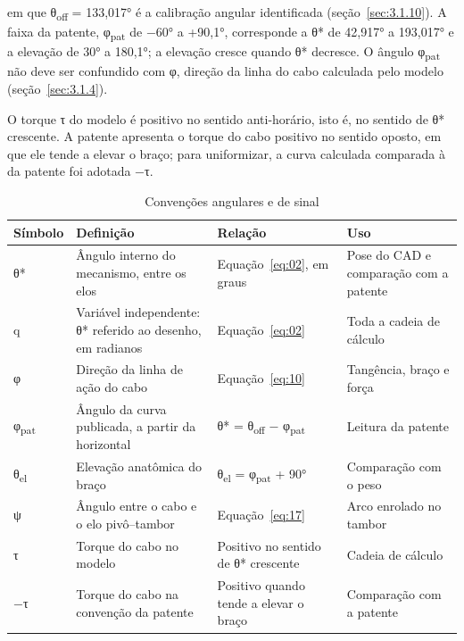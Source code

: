 em que θ\textsubscript{off} = 133,017° é a calibração angular identificada (seção~\ref{sec:3.1.10}). A faixa da patente, φ\textsubscript{pat} de −60° a +90,1°, corresponde a θ* de 42,917° a 193,017° e a elevação de 30° a 180,1°; a elevação cresce quando θ* decresce. O ângulo φ\textsubscript{pat} não deve ser confundido com φ, direção da linha do cabo calculada pelo modelo (seção~\ref{sec:3.1.4}).

O torque τ do modelo é positivo no sentido anti-horário, isto é, no sentido de θ* crescente. A patente apresenta o torque do cabo positivo no sentido oposto, em que ele tende a elevar o braço; para uniformizar, a curva calculada comparada à da patente foi adotada −τ.

\begin{table}[!htbp]
\estilotabela{\small}
\caption{Convenções angulares e de sinal}\label{tab:convencoes-angulares-sinal}
\begin{tabularx}{\textwidth}{@{}>{\hsize=0.556\hsize\centering\arraybackslash}X>{\hsize=1.368\hsize\raggedright\arraybackslash}X>{\hsize=1.179\hsize\raggedright\arraybackslash}X>{\hsize=0.897\hsize\raggedright\arraybackslash}X@{}}
\toprule
\centering\textbf{Símbolo} & \centering\textbf{Definição} & \centering\textbf{Relação} & \centering\textbf{Uso} \tabularnewline
\midrule
θ* & Ângulo interno do mecanismo, entre os elos & Equação~\eqref{eq:02}, em graus & Pose do CAD e comparação com a patente \\
q & Variável independente: θ* referido ao desenho, em radianos & Equação~\eqref{eq:02} & Toda a cadeia de cálculo \\
φ & Direção da linha de ação do cabo & Equação~\eqref{eq:10} & Tangência, braço e força \\
φ\textsubscript{pat} & Ângulo da curva publicada, a partir da horizontal & θ* = θ\textsubscript{off} − φ\textsubscript{pat} & Leitura da patente \\
θ\textsubscript{el} & Elevação anatômica do braço & θ\textsubscript{el} = φ\textsubscript{pat} + 90° & Comparação com o peso \\
ψ & Ângulo entre o cabo e o elo pivô–tambor & Equação~\eqref{eq:17} & Arco enrolado no tambor \\
τ & Torque do cabo no modelo & Positivo no sentido de θ* crescente & Cadeia de cálculo \\
−τ & Torque do cabo na convenção da patente & Positivo quando tende a elevar o braço & Comparação com a patente \\
\bottomrule
\end{tabularx}
\end{table}

